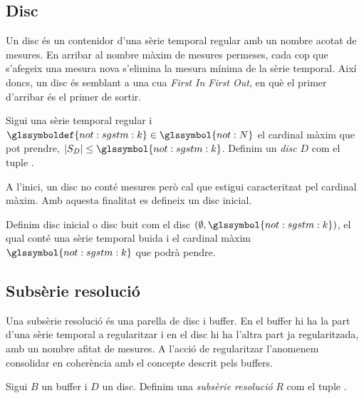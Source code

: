 \subsection{Disc}\label{sec:model:disc}


Un disc és un contenidor d'una sèrie temporal regular amb un nombre
acotat de mesures. En arribar al nombre màxim de mesures permeses,
cada cop que s'afegeix una mesura nova s'elimina la mesura mínima de
la sèrie temporal.  Així doncs, un disc és semblant a una cua
\emph{First In First Out}, en què el primer d'arribar és el
primer de sortir.

\begin{definition}[Disc]
  Sigui  una sèrie temporal regular i
  $\glssymboldef{not:sgstm:k}\in\glssymbol{not:N}$ el cardinal màxim
  que pot prendre, $|S_D|\leq \glssymbol{not:sgstm:k}$.  Definim
  un \emph{disc} $D$ com el tuple
  .
\end{definition}

A l'inici, un disc no conté mesures però cal que estigui caracteritzat
pel cardinal màxim. Amb aquesta finalitat es defineix un disc inicial.

\begin{definition}\label{def:model:disc_buit}
  Definim disc inicial o disc buit com el disc
  $(\emptyset,\glssymbol{not:sgstm:k})$, el qual conté una sèrie
  temporal buida i el cardinal màxim $\glssymbol{not:sgstm:k}$ que podrà pendre.
\end{definition}



\subsection{Subsèrie resolució}\label{sec:model:subserie-resolucio}


Una subsèrie resolució és una parella de disc i buffer. En el
buffer hi ha la part d'una sèrie temporal a regularitzar i en el disc
hi ha l'altra part ja regularitzada, amb un nombre afitat de
mesures. A l'acció de regularitzar l'anomenem consolidar en coherència
amb el concepte descrit pels buffers. 



\begin{definition}
  Sigui $B$ un buffer i $D$
  un disc.
  Definim una \emph{subsèrie resolució} $R$ com el tuple
  .
\end{definition}
 
